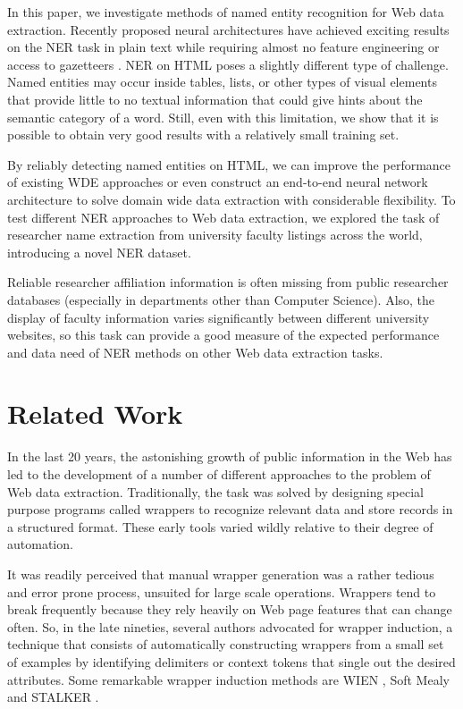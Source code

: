 \documentclass{nle}
\begin{document}
In this paper, we investigate methods of named entity recognition for Web data extraction.
Recently proposed neural architectures have achieved exciting results 
on the NER task in plain text while requiring almost 
no feature engineering or access to gazetteers \cite{Huang2015,Lample2016,Ma2016}. 
NER on HTML poses a slightly different type of challenge. Named entities may occur inside 
tables, lists, or other types of visual elements that provide little to no textual 
information that could give hints about the semantic category of a word. Still, even 
with this limitation, we show that it is possible to obtain very good results with a 
relatively small training set.

By reliably detecting named entities on HTML, we can improve the performance of existing WDE 
approaches or even construct an end-to-end neural network architecture to solve domain 
wide data extraction with considerable flexibility. To test different NER approaches to
Web data extraction, we explored the task of researcher name extraction from university 
faculty listings across the world, introducing a novel NER dataset.

Reliable researcher affiliation information is often missing from public researcher 
databases (especially in departments other than Computer Science). Also, the display of 
faculty information varies significantly between different university websites, so 
this task can provide a good measure of the expected performance and data need of
NER methods on other Web data extraction tasks. 


\section{Related Work}

In the last 20 years, the astonishing growth of public information in the Web has 
led to the development of a number of different approaches to the problem of Web 
data extraction. Traditionally, the task was solved by designing special purpose
programs called wrappers to recognize relevant data and store records in a structured
format. These early tools varied wildly relative to their degree of automation. 

It was readily perceived that manual wrapper generation was a rather tedious and
error prone process, unsuited for large scale operations. Wrappers tend to
break frequently because they rely heavily on Web page features that can change 
often. So, in the late nineties, several authors advocated for wrapper induction, a technique 
that consists of automatically constructing wrappers from a small set of examples by 
identifying delimiters or context tokens that single out the desired attributes. 
Some remarkable wrapper induction methods are WIEN \cite{Kushmerick2000}, Soft 
Mealy \cite{Hsu1998} and STALKER \cite{Muslea1999}.
\end{document}
